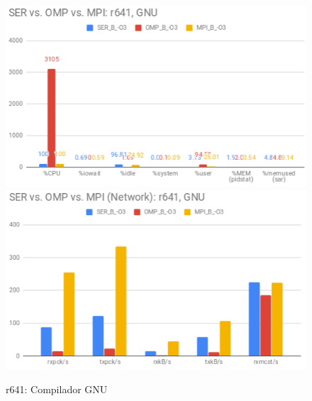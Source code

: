 \documentclass{article}
\begin{document}
\begin{appendices}
\begin{figure}[H]
    \centering
    \includegraphics[width=12cm]{Pictures/FT_SER_OMP_MPI_r641_GNU_Comp.png}
    \includegraphics[width=12cm]{Pictures/FT_SER_OMP_MPI_r641_GNU_Comm.png}
    \caption{r641: Compilador GNU}
    \label{fig:ft_ser_omp_mpi_r641_gnu}
\end{figure}


\end{appendices}
\end{document}

